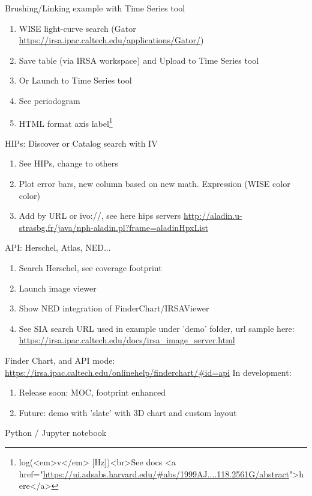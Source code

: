\documentclass[11pt,twoside]{article}
\begin{document}
Brushing/Linking example with Time Series tool
\begin{enumerate}
  \item WISE light-curve search (Gator \url{https://irsa.ipac.caltech.edu/applications/Gator/})
  \item Save table (via IRSA workspace) and Upload to Time Series tool
  \item Or Launch to Time Series tool
  \item See periodogram
  \item HTML format axis label\footnote{log(<em>v</em> [Hz])<br>See docs <a href="\url{https://ui.adsabs.harvard.edu/\#abs/1999AJ....118.2561G/abstract}">here</a>}
\end{enumerate}
\smallskip
HIPs: Discover or Catalog search with IV

\begin{enumerate}
  \item See HIPs, change to others
  \item Plot error bars, new column based on new math. Expression (WISE color color)
  \item Add by URL or ivo://, see here hips servers \url{http://aladin.u-strasbg.fr/java/nph-aladin.pl?frame=aladinHpxList}
\end{enumerate}


API: Herschel, Atlas, NED...
\begin{enumerate}
  \item Search Herschel, see coverage footprint
  \item Launch image viewer
  \item Show NED integration of FinderChart/IRSAViewer
  \item See SIA search URL used in example under 'demo' folder, url sample here: \url{https://irsa.ipac.caltech.edu/docs/irsa_image_server.html}
\end{enumerate}
\smallskip
Finder Chart, and API mode: \url{https://irsa.ipac.caltech.edu/onlinehelp/finderchart/#id=api}
In development:

\begin{enumerate}
  \item Release soon: MOC, footprint enhanced
  \item Future:  demo with 'slate' with 3D chart and custom layout
\end{enumerate}
\smallskip
Python / Jupyter notebook
\end{document}
